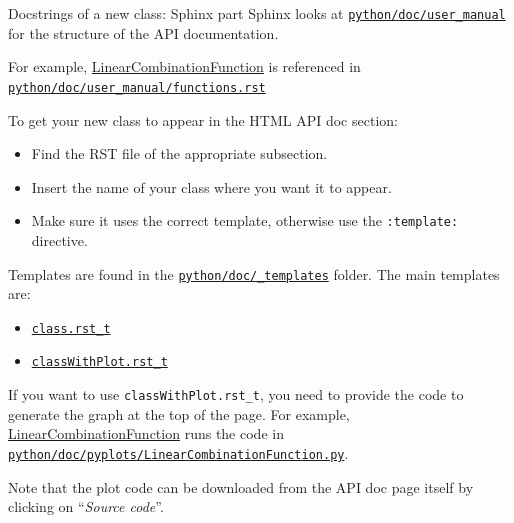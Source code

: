\documentclass[8pt]{beamer}
\begin{document}
\begin{frame}{Docstrings of a new class: Sphinx part}
Sphinx looks at \href{https://github.com/openturns/openturns/tree/master/python/doc/user_manual}{\texttt{python/\alert{doc}/user\_manual}} for the structure of the API documentation.

For example, \href{https://openturns.github.io/openturns/master/user_manual/_generated/openturns.LinearCombinationFunction.html}{\alert{LinearCombinationFunction}} is referenced in \href{https://github.com/openturns/openturns/blob/master/python/doc/user_manual/functions.rst}{\texttt{python/doc/user\_manual/functions.rst}}

To get your new class to appear in the \alert{HTML API doc} section:

\begin{itemize}
    \item Find the \alert{RST file} of the appropriate subsection.
    \item \alert{Insert the name} of your class where you want it to appear.
    \item Make sure it uses the correct \alert{template}, otherwise use the \texttt{:template:} directive.
\end{itemize}

Templates are found in the \href{https://github.com/openturns/openturns/tree/master/python/doc/_templates}{\texttt{python/doc/\_templates}} folder. The main templates are:

\begin{itemize}
    \item \href{https://github.com/openturns/openturns/blob/master/python/doc/_templates/class.rst_t}{\alert{\texttt{class.rst\_t}}}
    \item \href{https://github.com/openturns/openturns/blob/master/python/doc/_templates/classWithPlot.rst_t}{\alert{\texttt{classWithPlot.rst\_t}}}
\end{itemize}

If you want to use \texttt{classWithPlot.rst\_t}, you need to provide the code to generate the graph at the top of the page. For example, \href{https://openturns.github.io/openturns/master/user_manual/_generated/openturns.LinearCombinationFunction.html}{\alert{LinearCombinationFunction}} runs the code in
\href{https://github.com/openturns/openturns/blob/master/python/doc/pyplots/LinearCombinationFunction.py}{\texttt{\alert{python/doc/pyplots}/LinearCombinationFunction.py}}.

Note that the plot code can be downloaded from the API doc page itself by clicking on ``\emph{Source code}''.
\end{frame}
\end{document}
